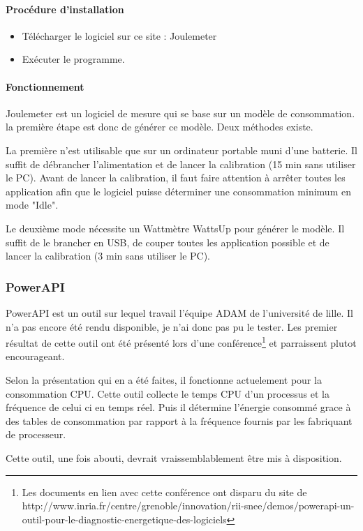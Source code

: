 \documentclass[a4paper, 11pt]{report}
\begin{document}
\paragraph{Procédure d'installation}
\begin{itemize}
	\item Télécharger le logiciel sur ce site : Joulemeter
	\item Exécuter le programme.
\end{itemize}

\paragraph{Fonctionnement}
Joulemeter est un logiciel de mesure qui se base sur un modèle de consommation. la première étape est donc de générer ce modèle. Deux méthodes existe.

La première n’est utilisable que sur un ordinateur portable muni d’une batterie. Il suffit de débrancher l’alimentation et de lancer la calibration (15 min sans utiliser le PC). Avant de lancer la calibration, il faut faire attention à arrêter toutes les application afin que le logiciel puisse déterminer une consommation minimum en mode "Idle".

Le deuxième mode nécessite un Wattmètre WattsUp pour générer le modèle. Il suffit de le brancher en USB, de couper toutes les application possible et de lancer la calibration (3 min sans utiliser le PC).

\subsubsection{PowerAPI}
PowerAPI est un outil sur lequel travail l'équipe ADAM de l'université de lille. Il n'a pas encore été rendu disponible, je n'ai donc pas pu le tester. Les premier résultat de cette outil ont été présenté lors d'une conférence\footnote{Les documents en lien avec cette conférence ont disparu du site de http://www.inria.fr/centre/grenoble/innovation/rii-snee/demos/powerapi-un-outil-pour-le-diagnostic-energetique-des-logiciels} et parraissent plutot encourageant.

Selon la présentation qui en a été faites, il fonctionne actuelement pour la consommation CPU. Cette outil collecte le temps CPU d'un processus et la fréquence de celui ci en temps réel. Puis il détermine l'énergie consommé grace à des tables de consommation par rapport à la fréquence fournis par les fabriquant de processeur.

Cette outil, une fois abouti, devrait vraissemblablement être mis à disposition.
\end{document}
